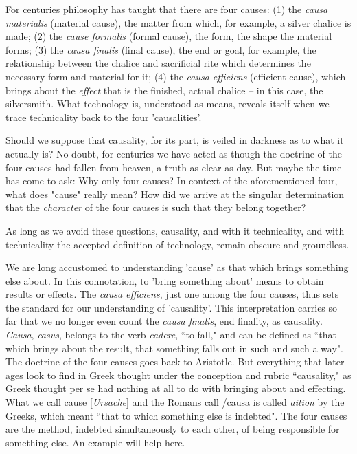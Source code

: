\documentclass[12pt]{article}
\begin{document}
For centuries philosophy has taught that there are four causes: (1) the \textit{causa materialis} (material cause), the matter from which, for example, a silver chalice is made; (2) the \textit{cause formalis} (formal cause), the form, the shape the material forms; (3) the \textit{causa finalis} (final cause), the end or goal, for example, the relationship between the chalice and sacrificial rite which determines the necessary form and material for it; (4) the \textit{causa efficiens} (efficient cause), which brings about the \textit{effect} that is the finished, actual chalice -- in this case, the silversmith. What technology is, understood as means, reveals itself when we trace technicality back to the four 'causalities'.

Should we suppose that causality, for its part, is veiled in darkness as to what it actually is? No doubt, for centuries we have acted as though the doctrine of the four causes had fallen from heaven, a truth as clear as day. But maybe the time has come to ask: Why only four causes? In context of the aforementioned four, what does "cause" really mean? How did we arrive at the singular determination that the \textit{character} of the four causes is such that they belong together?

As long as we avoid these questions, causality, and with it technicality, and with technicality the accepted definition of technology, remain obscure and groundless.

We are long accustomed to understanding 'cause' as that which brings something else about. In this connotation, to 'bring something about' means to obtain results or effects. The \textit{causa efficiens}, just one among the four causes, thus sets the standard for our understanding of 'causality'. This interpretation carries so far that we no longer even count the \textit{causa finalis}, end finality, as causality. \textit{Causa}, \textit{casus}, belongs to the verb \textit{cadere}, ``to fall," and can be defined as ``that which brings about the result, that something falls out in such and such a way". The doctrine of the four causes goes back to Aristotle. But everything that later ages look to find in Greek thought under the conception and rubric ``causality," as Greek thought per se had nothing at all to do with bringing about and effecting. What we call cause [\textit{Ursache}] and the Romans call /{causa} is called \textit{aition} by the Greeks, which meant ``that to which something else is indebted". The four causes are the method, indebted simultaneously to each other, of being responsible for something else. An example will help here.
\end{document}
